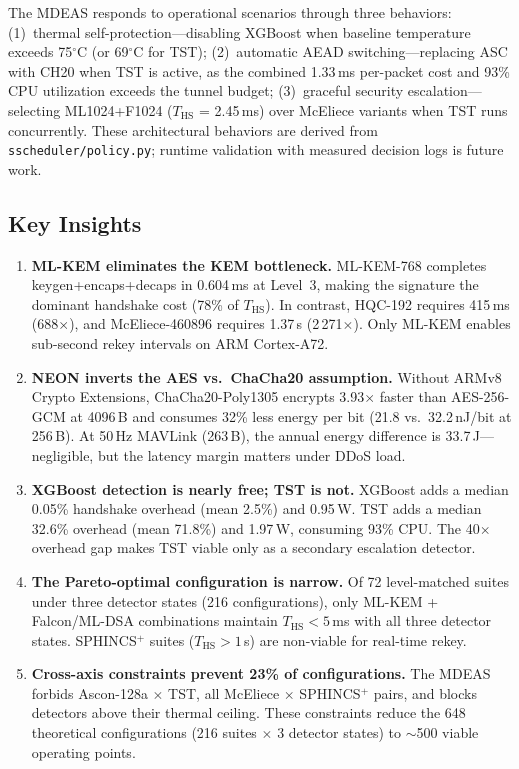 The MDEAS responds to operational scenarios through three behaviors:
(1)~thermal self-protection—disabling XGBoost when baseline temperature
exceeds 75$^\circ$C (or 69$^\circ$C for TST);
(2)~automatic AEAD switching—replacing ASC with CH20 when TST is
active, as the combined 1.33\,ms per-packet cost and 93\% CPU
utilization exceeds the tunnel budget;
(3)~graceful security escalation—selecting ML1024+F1024 ($T_\text{HS}$
= 2.45\,ms) over McEliece variants when TST runs concurrently.
These architectural behaviors are derived from
\texttt{sscheduler/policy.py}; runtime validation with measured
decision logs is future work.

\subsection{Key Insights}
\label{sec:insights}

\begin{enumerate}
\item \textbf{ML-KEM eliminates the KEM bottleneck.}
  ML-KEM-768 completes keygen+encaps+decaps in 0.604\,ms at Level~3,
  making the signature the dominant handshake cost (78\% of $T_\text{HS}$).
  In contrast, HQC-192 requires 415\,ms (688$\times$), and
  McEliece-460896 requires 1.37\,s (2\,271$\times$).  Only ML-KEM
  enables sub-second rekey intervals on ARM Cortex-A72.

\item \textbf{NEON inverts the AES vs.\ ChaCha20 assumption.}
  Without ARMv8 Crypto Extensions, ChaCha20-Poly1305 encrypts
  3.93$\times$ faster than AES-256-GCM at 4096\,B and consumes
  32\% less energy per bit (21.8 vs.\ 32.2\,nJ/bit at 256\,B).
  At 50\,Hz MAVLink (263\,B), the annual energy difference is
  33.7\,J—negligible, but the latency margin matters under DDoS load.

\item \textbf{XGBoost detection is nearly free; TST is not.}
  XGBoost adds a median 0.05\% handshake overhead (mean 2.5\%)
  and 0.95\,W.  TST adds a median 32.6\% overhead (mean 71.8\%)
  and 1.97\,W, consuming 93\% CPU. The 40$\times$ overhead gap
  makes TST viable only as a secondary escalation detector.

\item \textbf{The Pareto-optimal configuration is narrow.}
  Of 72 level-matched suites under three detector states (216
  configurations), only ML-KEM + Falcon/ML-DSA combinations maintain
  $T_\text{HS} < 5$\,ms with all three detector states.  SPHINCS$^+$
  suites ($T_\text{HS} > 1$\,s) are non-viable for real-time rekey.

\item \textbf{Cross-axis constraints prevent 23\% of configurations.}
  The MDEAS forbids Ascon-128a $\times$ TST, all McEliece $\times$
  SPHINCS$^+$ pairs, and blocks detectors above their thermal
  ceiling.  These constraints reduce the 648 theoretical
  configurations (216 suites $\times$ 3 detector states) to
  $\sim$500 viable operating points.
\end{enumerate}

